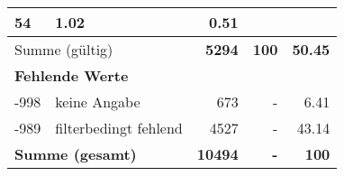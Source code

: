 \begin{longtable}{lXrrr}
       \num{54} &
       \num[round-mode=places,round-precision=2]{1,02} &
         \num[round-mode=places,round-precision=2]{0,51} \\
     \midrule
     \multicolumn{2}{l}{Summe (gültig)} &
       \textbf{\num{5294}} &
     \textbf{100} &
       \textbf{\num[round-mode=places,round-precision=2]{50,45}} \\
     \multicolumn{5}{l}{\textbf{Fehlende Werte}}\\
       -998 &
       keine Angabe &
         \num{673} &
        - &
         \num[round-mode=places,round-precision=2]{6,41} \\
       -989 &
       filterbedingt fehlend &
         \num{4527} &
        - &
         \num[round-mode=places,round-precision=2]{43,14} \\
     \midrule
     \multicolumn{2}{l}{\textbf{Summe (gesamt)}} &
          \textbf{\num{10494}} &
        \textbf{-} &
        \textbf{100} \\
     \bottomrule
     \end{longtable}
     

